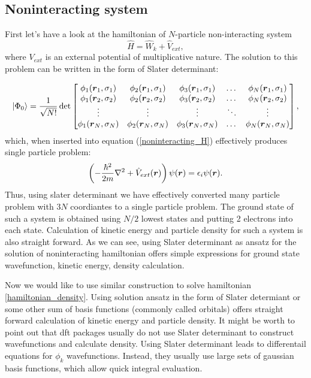 \documentclass[openany, longbibliography,slovene,a4paper,12pt]{article}
\def\vec#1{\mbox{\boldmath$#1$}}
\begin{document}
\subsection{Noninteracting system}
 First let's have a look at the hamiltonian of $N$-particle non-interacting system
 \begin{equation} \label{noninteracting_H}
   \hat H =\hat  W_k + \hat V_{ext}, 
 \end{equation}
 where $V_{ext}$ is an external potential of multiplicative nature. The solution
 to this problem can be written in the form of Slater determinant:

 \[
       \ket{\Phi_0} = \frac{1}{\sqrt{N!}}\det 
   \begin{bmatrix}
   \phi_{1}(\vec r_1, \sigma_1) & \phi_{2}(\vec r_1, \sigma_1) & \phi_{3}(\vec
   r_1, \sigma_1) & \dots & \phi_{N}(\vec r_1, \sigma_1) \\
    \phi_{1}(\vec r_2, \sigma_2) & \phi_{2}(\vec r_2, \sigma_2) & \phi_{3}(\vec
    r_2, \sigma_2) & \dots & \phi_{N}(\vec r_2, \sigma_2) \\
    \vdots & \vdots & \vdots & \ddots & \vdots \\
     \phi_{1}(\vec r_N, \sigma_N) & \phi_{2}(\vec r_N, \sigma_N) & \phi_{3}(\vec r_N, \sigma_N) & \dots & \phi_{N}(\vec r_N, \sigma_N) \\
\end{bmatrix},
\]
 which, when inserted into equation (\ref{noninteracting_H}) effectively produces
 single particle problem:
 \begin{equation}
   \left(-\frac{\hbar^2}{2m}\nabla^2 + \hat V_{ext}(\vec r)\right) \psi (\vec r) = \epsilon_i \psi(\vec r).
 \end{equation}
 Thus, using slater determinant we have effectively converted many particle
 problem with $3N$ coordiantes to a single particle problem.
 The ground state of such a system is obtained using $N/2$ lowest states and
 putting 2 electrons into each state. Calculation of kinetic energy and particle
 density for such a system is also straight forward. As we can see, using Slater
 determinant as ansatz for the solution of noninteracting hamiltonian offers
 simple expressions for ground state wavefunction, kinetic energy, density
 calculation.  

Now we would like to use similar construction to solve hamiltonian
\ref{hamiltonian_density}. Using solution ansatz in the form of Slater
determiant or some other sum of basis functions (commonly called orbitals) offers straight forward
calculation of kinetic energy and  particle density. It might be worth to point
out that dft packages usually do not use Slater determinant to construct
wavefunctions and calculate density. Using Slater determinant leads to
differentail equations for $\phi_k$ wavefunctions. Instead, they usually use
large sets of gaussian basis functions, which allow quick integral evaluation.
 
\end{document}
